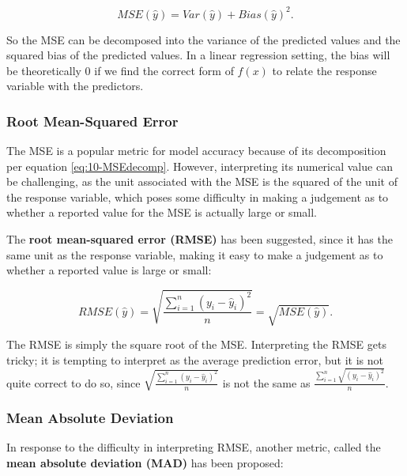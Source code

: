 \documentclass[
]{book}
\begin{document}
\begin{equation} 
MSE(\hat{y}) = Var(\hat{y}) + Bias(\hat{y})^2.
\label{eq:10-MSEdecomp}
\end{equation}

So the MSE can be decomposed into the variance of the predicted values and the squared bias of the predicted values. In a linear regression setting, the bias will be theoretically 0 if we find the correct form of \(f(x)\) to relate the response variable with the predictors.

\hypertarget{root-mean-squared-error}{%
\subsubsection{Root Mean-Squared Error}\label{root-mean-squared-error}}

The MSE is a popular metric for model accuracy because of its decomposition per equation \eqref{eq:10-MSEdecomp}. However, interpreting its numerical value can be challenging, as the unit associated with the MSE is the squared of the unit of the response variable, which poses some difficulty in making a judgement as to whether a reported value for the MSE is actually large or small.

The \textbf{root mean-squared error (RMSE)} has been suggested, since it has the same unit as the response variable, making it easy to make a judgement as to whether a reported value is large or small:

\begin{equation} 
RMSE(\hat{y}) = \sqrt{\frac{\sum_{i=1}^n (y_i - \hat{y}_i)^2}{n}} = \sqrt{MSE(\hat{y})}.
\label{eq:10-RMSE}
\end{equation}

The RMSE is simply the square root of the MSE. Interpreting the RMSE gets tricky; it is tempting to interpret as the average prediction error, but it is not quite correct to do so, since \(\sqrt{\frac{\sum_{i=1}^n (y_i - \hat{y}_i)^2}{n}}\) is not the same as \(\frac{\sum_{i=1}^n \sqrt{(y_i - \hat{y}_i)^2}}{n}\).

\hypertarget{mean-absolute-deviation}{%
\subsubsection{Mean Absolute Deviation}\label{mean-absolute-deviation}}

In response to the difficulty in interpreting RMSE, another metric, called the \textbf{mean absolute deviation (MAD)} has been proposed:
\end{document}

